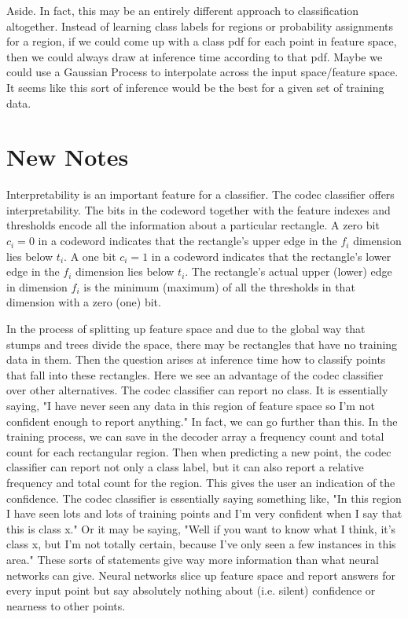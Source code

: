 \documentclass{article}
\begin{document}
Aside.  In fact, this may be an entirely different approach to classification altogether.  Instead of learning class labels for regions or probability assignments for a region, if we could come up with a class pdf for each point in feature space, then we could always draw at inference time according to that pdf.  Maybe we could use a Gaussian Process to interpolate across the input space/feature space.  It seems like this sort of inference would be the best for a given set of training data.

\section{New Notes}

Interpretability is an important feature for a classifier.  The codec classifier offers interpretability.  The bits in the codeword together with the feature indexes and thresholds encode all the information about a particular rectangle.  A zero bit $c_i=0$ in a codeword indicates that the rectangle's upper edge in the $f_i$ dimension lies below $t_i$.  A one bit $c_i=1$ in a codeword indicates that the rectangle's lower edge in the $f_i$ dimension lies below $t_i$.  The rectangle's actual upper (lower) edge in dimension $f_i$ is the minimum (maximum) of all the thresholds in that dimension with a zero (one) bit.

In the process of splitting up feature space and due to the global way that stumps and trees divide the space, there may be rectangles that have no training data in them.  Then the question arises at inference time how to classify points that fall into these rectangles.  Here we see an advantage of the codec classifier over other alternatives.  The codec classifier can report no class.  It is essentially saying, "I have never seen any data in this region of feature space so I'm not confident enough to report anything."  In fact, we can go further than this.  In the training process, we can save in the decoder array a frequency count and total count for each rectangular region.  Then when predicting a new point, the codec classifier can report not only a class label, but it can also report a relative frequency and total count for the region.  This gives the user an indication of the confidence.  The codec classifier is essentially saying something like, "In this region I have seen lots and lots of training points and I'm very confident when I say that this is class x."  Or it may be saying, "Well if you want to know what I think, it's class x, but I'm not totally certain, because I've only seen a few instances in this area."  These sorts of statements give way more information than what neural networks can give.  Neural networks slice up feature space and report answers for every input point but say absolutely nothing about (i.e. silent) confidence or nearness to other points.
\end{document}
